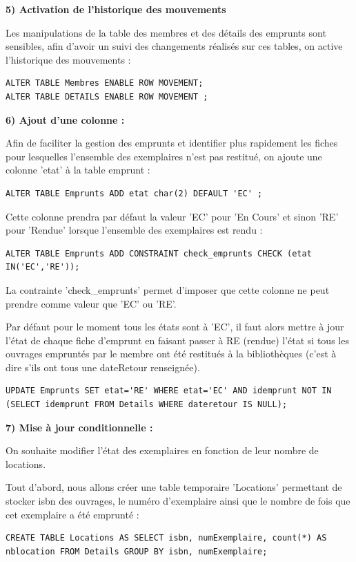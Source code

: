 \documentclass[a4paper,12pt]{article}
\begin{document}
  \textbf {5) Activation de l’historique des mouvements}
  
Les manipulations de la table des membres et des détails des emprunts sont sensibles, afin d'avoir un suivi des changements réalisés sur ces tables, on active l’historique des mouvements :
\begin{lstlisting}
ALTER TABLE Membres ENABLE ROW MOVEMENT; 
ALTER TABLE DETAILS ENABLE ROW MOVEMENT ;
  \end{lstlisting}
  
  \clearpage
  
    \textbf {6) Ajout d’une colonne :}
    
Afin de faciliter la gestion des emprunts et identifier plus rapidement les fiches pour lesquelles l'ensemble des exemplaires n'est pas restitué, on ajoute une colonne 'etat' à la table emprunt : 
\begin{lstlisting}
ALTER TABLE Emprunts ADD etat char(2) DEFAULT 'EC' ;
\end{lstlisting}
Cette colonne prendra par défaut la valeur 'EC' pour 'En Cours' et sinon 'RE' pour 'Rendue' lorsque l'ensemble des exemplaires est rendu : 
\begin{lstlisting}
ALTER TABLE Emprunts ADD CONSTRAINT check_emprunts CHECK (etat IN('EC','RE'));
\end{lstlisting}
La contrainte 'check\_emprunts' permet d'imposer que cette colonne ne peut prendre comme valeur que 'EC' ou 'RE'. 

Par défaut pour le moment tous les états sont à 'EC', il faut alors mettre à jour l'état de chaque fiche d'emprunt en faisant passer à RE (rendue) l'état si tous les ouvrages empruntés par le membre ont été restitués à la bibliothèques (c'est à dire s'ils ont tous une dateRetour renseignée).

\begin{lstlisting}
UPDATE Emprunts SET etat='RE' WHERE etat='EC' AND idemprunt NOT IN (SELECT idemprunt FROM Details WHERE dateretour IS NULL);
\end{lstlisting}

  \textbf {7) Mise à jour conditionnelle :}

On souhaite modifier l’état des exemplaires en fonction de leur nombre de locations. 

Tout d'abord, nous allons créer une table temporaire 'Locations' permettant de stocker isbn des ouvrages, le numéro d'exemplaire ainsi que le nombre de fois que cet exemplaire a été emprunté :

\begin{lstlisting}
CREATE TABLE Locations AS SELECT isbn, numExemplaire, count(*) AS nblocation FROM Details GROUP BY isbn, numExemplaire;
\end{lstlisting}
\end{document}
